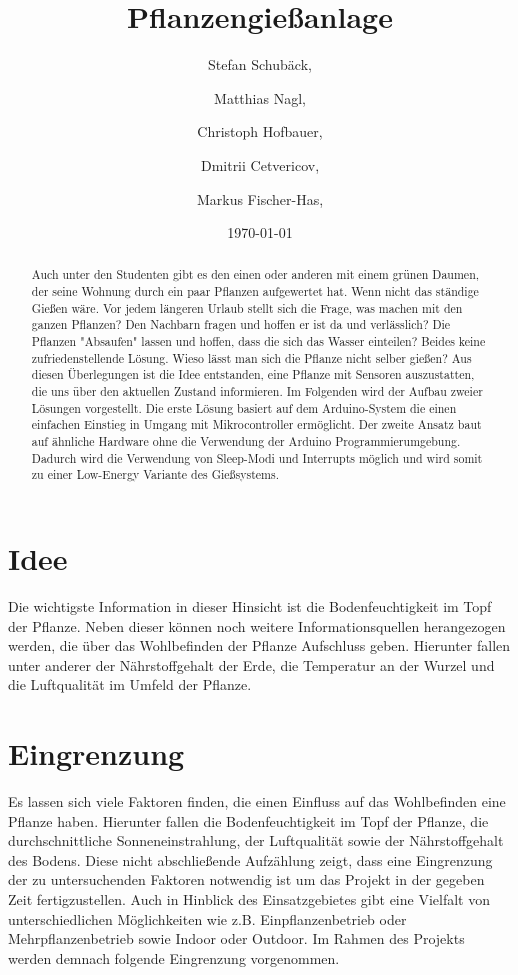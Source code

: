 \documentclass[]{IEEEtran}
\title{Pflanzengießanlage}
\date{\today}
\author{ Stefan Schubäck, \and Matthias Nagl,\and Christoph Hofbauer, \and Dmitrii Cetvericov, \and Markus Fischer-Has,}
\begin{document}
	\maketitle

\begin{abstract}
Auch unter den Studenten gibt es den einen oder anderen mit einem grünen Daumen, der seine Wohnung durch ein paar Pflanzen aufgewertet hat. 
Wenn nicht das ständige Gießen wäre. 
Vor jedem längeren Urlaub stellt sich die Frage, was machen mit den ganzen Pflanzen? 
Den Nachbarn fragen und hoffen er ist da und verlässlich? 
Die Pflanzen "Absaufen" lassen und hoffen, dass die sich das Wasser einteilen? 
Beides keine zufriedenstellende Lösung. Wieso lässt man sich die Pflanze nicht selber gießen?
Aus diesen Überlegungen ist die Idee entstanden, eine Pflanze mit Sensoren auszustatten, die uns über den aktuellen Zustand informieren. 
Im Folgenden wird der Aufbau zweier Lösungen vorgestellt. 
Die erste Lösung basiert auf dem Arduino-System die einen einfachen Einstieg in Umgang mit Mikrocontroller ermöglicht. 
Der zweite Ansatz baut auf ähnliche Hardware ohne die Verwendung der Arduino Programmierumgebung. 
Dadurch wird die Verwendung von Sleep-Modi und Interrupts möglich und wird somit zu einer Low-Energy Variante des Gießsystems.  

\end{abstract}
\section{Idee}\label{refIdee}

 Die wichtigste Information in dieser Hinsicht ist die Bodenfeuchtigkeit im Topf der Pflanze. 
 Neben dieser können noch weitere Informationsquellen herangezogen werden, die über das Wohlbefinden der Pflanze Aufschluss geben. 
 Hierunter fallen unter anderer der Nährstoffgehalt der Erde, die Temperatur an der Wurzel und die Luftqualität im Umfeld der Pflanze.



\section{Eingrenzung}
Es lassen sich viele Faktoren finden, die einen Einfluss auf das Wohlbefinden eine Pflanze haben. 
Hierunter fallen die Bodenfeuchtigkeit im Topf der Pflanze, die durchschnittliche Sonneneinstrahlung, der Luftqualität sowie der Nährstoffgehalt des Bodens. 
Diese nicht abschließende Aufzählung zeigt, dass eine Eingrenzung der zu untersuchenden Faktoren notwendig ist um das Projekt in der gegeben Zeit fertigzustellen.
Auch in Hinblick des Einsatzgebietes gibt eine Vielfalt von unterschiedlichen Möglichkeiten wie z.B. Einpflanzenbetrieb oder Mehrpflanzenbetrieb sowie Indoor oder Outdoor. 
Im Rahmen des Projekts werden demnach folgende Eingrenzung vorgenommen.
\end{document}
